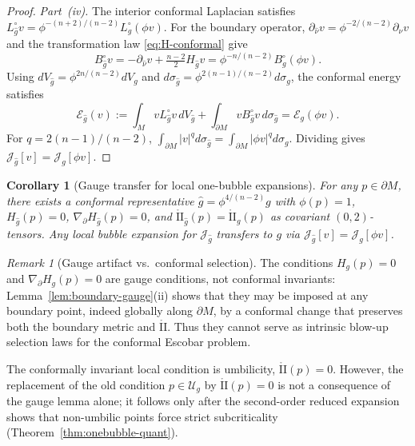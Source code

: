 \documentclass[11pt,reqno,a4paper]{amsart}
\numberwithin{equation}{section}
\theoremstyle{plain}
\newtheorem{corollary}[theorem]{Corollary}
\theoremstyle{remark}
\newtheorem{remark}[theorem]{Remark}
\theoremstyle{plain}
\begin{document}
\begin{proof}
\smallskip
\emph{Part~(iv).}
The interior conformal Laplacian satisfies
$L_{\hat g}^\circ v=\phi^{-(n+2)/(n-2)}L_g^\circ(\phi v)$.
For the boundary operator,
$\partial_{\hat\nu}v=\phi^{-2/(n-2)}\partial_\nu v$
and the transformation law \eqref{eq:H-conformal} give
\[
B_{\hat g}^\circ v
=-\partial_{\hat\nu}v+\tfrac{n-2}{2}H_{\hat g}v
=\phi^{-n/(n-2)}B_g^\circ(\phi v).
\]
Using $dV_{\hat g}=\phi^{2n/(n-2)}dV_g$ and
$d\sigma_{\hat g}=\phi^{2(n-1)/(n-2)}d\sigma_g$,
the conformal energy satisfies
\[
\mathcal E_{\hat g}(v)
:=\int_M vL_{\hat g}^\circ v\,dV_{\hat g}
+\int_{\partial M}vB_{\hat g}^\circ v\,d\sigma_{\hat g}
=\mathcal E_g(\phi v).
\]
For $q=2(n-1)/(n-2)$,
$\int_{\partial M}|v|^q d\sigma_{\hat g}
=\int_{\partial M}|\phi v|^q d\sigma_g$.
Dividing gives
$\mathcal J_{\hat g}[v]=\mathcal J_g[\phi v]$.
\end{proof}

\begin{corollary}[Gauge transfer for local one-bubble expansions]
\label{cor:gauge-transfer-onebubble}
For any $p\in\partial M$, there exists a conformal representative
$\hat g=\phi^{4/(n-2)}g$ with $\phi(p)=1$,
$H_{\hat g}(p)=0$,
$\nabla_\partial H_{\hat g}(p)=0$,
and
$\mathring{\mathrm{II}}_{\hat g}(p)=\mathring{\mathrm{II}}_g(p)$
as covariant $(0,2)$-tensors.
Any local bubble expansion for $\mathcal J_{\hat g}$ transfers to $g$
via $\mathcal J_{\hat g}[v]=\mathcal J_g[\phi v]$.
\end{corollary}

\begin{remark}[Gauge artifact vs.\ conformal selection]\label{rem:gauge-vs-selection}
The conditions $H_g(p)=0$ and $\nabla_\partial H_g(p)=0$ are gauge conditions,
not conformal invariants:
Lemma~\ref{lem:boundary-gauge}(ii) shows that they may be imposed at any
boundary point, indeed globally along $\partial M$, by a conformal change
that preserves both the boundary metric and $\mathring{\mathrm{II}}$.
Thus they cannot serve as intrinsic blow-up selection laws for the
conformal Escobar problem.

The conformally invariant local condition is umbilicity,
$\mathring{\mathrm{II}}(p)=0$.
However, the replacement of the old condition
$p\in\mathcal U_g$
by $\mathring{\mathrm{II}}(p)=0$
is not a consequence of the gauge lemma alone;
it follows only after the second-order reduced expansion shows that
non-umbilic points force strict subcriticality
(Theorem~\ref{thm:onebubble-quant}).
\end{remark}
\end{document}
